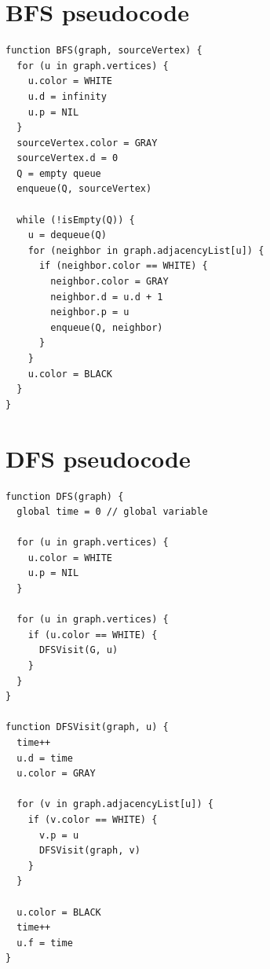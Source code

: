 \documentclass{article}
\begin{document}
\section{BFS pseudocode}

\begin{verbatim}
function BFS(graph, sourceVertex) {
  for (u in graph.vertices) {
    u.color = WHITE
    u.d = infinity
    u.p = NIL
  }
  sourceVertex.color = GRAY
  sourceVertex.d = 0
  Q = empty queue
  enqueue(Q, sourceVertex)

  while (!isEmpty(Q)) {
    u = dequeue(Q)
    for (neighbor in graph.adjacencyList[u]) {
      if (neighbor.color == WHITE) {
        neighbor.color = GRAY
        neighbor.d = u.d + 1
        neighbor.p = u
        enqueue(Q, neighbor)
      }
    }
    u.color = BLACK
  }
}
\end{verbatim}

\section{DFS pseudocode}

\begin{verbatim}
function DFS(graph) {
  global time = 0 // global variable

  for (u in graph.vertices) {
    u.color = WHITE
    u.p = NIL
  }

  for (u in graph.vertices) {
    if (u.color == WHITE) {
      DFSVisit(G, u)
    }
  }
}

function DFSVisit(graph, u) {
  time++
  u.d = time
  u.color = GRAY

  for (v in graph.adjacencyList[u]) {
    if (v.color == WHITE) {
      v.p = u
      DFSVisit(graph, v)
    }
  }

  u.color = BLACK
  time++
  u.f = time
}
\end{verbatim}
\end{document}
